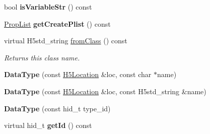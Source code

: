 \begin{DoxyCompactItemize}
\item 
\mbox{\label{class_h5_1_1_data_type_aa5adb455233c98194712df8af1931eaf}} 
bool {\bfseries is\+Variable\+Str} () const
\item 
\mbox{\label{class_h5_1_1_data_type_a12f730c06e0c085c1d1413afdfb8b8c1}} 
\hyperlink{class_h5_1_1_prop_list}{Prop\+List} {\bfseries get\+Create\+Plist} () const
\item 
\mbox{\label{class_h5_1_1_data_type_a54398643ff3dd5df349ab749192a2914}} 
virtual H5std\+\_\+string \hyperlink{class_h5_1_1_data_type_a54398643ff3dd5df349ab749192a2914}{from\+Class} () const
\begin{DoxyCompactList}\small\item\em Returns this class name. \end{DoxyCompactList}\item 
\mbox{\label{class_h5_1_1_data_type_a8bca13ea4ef489a368d6cf05095a63d5}} 
{\bfseries Data\+Type} (const \hyperlink{class_h5_1_1_h5_location}{H5\+Location} \&loc, const char $\ast$name)
\item 
\mbox{\label{class_h5_1_1_data_type_ac80544a58aa89c140e334567cbef8ecd}} 
{\bfseries Data\+Type} (const \hyperlink{class_h5_1_1_h5_location}{H5\+Location} \&loc, const H5std\+\_\+string \&name)
\item 
\mbox{\label{class_h5_1_1_data_type_a72b85216196ef1d980c5e43beaead07e}} 
{\bfseries Data\+Type} (const hid\+\_\+t type\+\_\+id)
\item 
\mbox{\label{class_h5_1_1_data_type_a52603cb308cd80717bef5a3cae289176}} 
virtual hid\+\_\+t {\bfseries get\+Id} () const
\end{DoxyCompactItemize}
